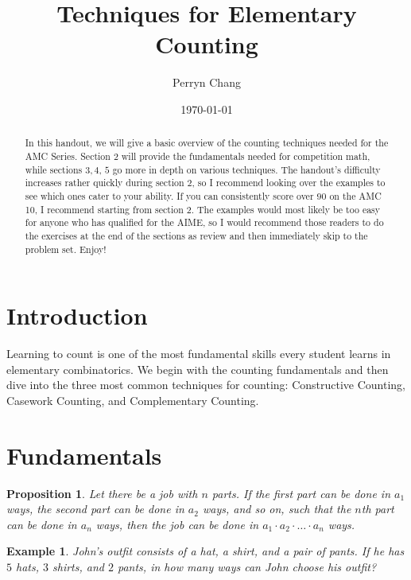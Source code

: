 \documentclass[letterpaper]{article}
\title{Techniques for Elementary Counting}
\author{Perryn Chang}
\date{\today}
\newtheorem{prop}[thm]{Proposition}
\newtheorem{example}[thm]{Example}
\theoremstyle{remark}
\theoremstyle{definition}
\begin{document}
\maketitle

\begin{abstract}
In this handout, we will give a basic overview of the counting techniques needed for the AMC Series. Section $2$ will provide the fundamentals needed for competition math, while sections $3,4$, $5$ go more in depth on various techniques. The handout's difficulty increases rather quickly during section $2$, so I recommend looking over the examples to see which ones cater to your ability. If you can consistently score over $90$ on the AMC 10, I recommend starting from section 2. The examples would most likely be too easy for anyone who has qualified for the AIME, so I would recommend those readers to do the exercises at the end of the sections as review and then immediately skip to the problem set. Enjoy! 
\end{abstract}

\section{Introduction}

Learning to count is one of the most fundamental skills every student learns in elementary combinatorics. We begin with the counting fundamentals and then dive into the three most common techniques for counting: Constructive Counting, Casework Counting, and Complementary Counting.

\section{Fundamentals}
\label{sec:examples}

\begin{prop}
Let there be a job with $n$ parts. If the first part can be done in $a_1$ ways, the second part can be done in $a_2$ ways, and so on, such that the $n$th part can be done in $a_n$ ways, then the job can be done in $a_1 \cdot a_2 \cdot \dots \cdot a_n$ ways.

\end{prop}

\begin{example}

John's outfit consists of a hat, a shirt, and a pair of pants. If he has $5$ hats, $3$ shirts, and $2$ pants, in how many ways can John choose his outfit?

\end{example}
\end{document}
